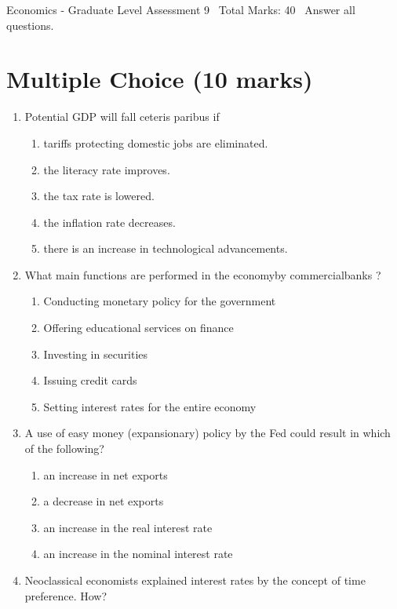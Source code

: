 \documentclass[12pt]{article}
\begin{document}
\begin{center}
Economics - Graduate Level Assessment 9 \
Total Marks: 40 \
Answer all questions.
\end{center}

\section*{Multiple Choice (10 marks)}
\begin{enumerate}[label=\arabic*.]
\item Potential GDP will fall ceteris paribus if
\begin{enumerate}[label=(\alph*)]
    \item tariffs protecting domestic jobs are eliminated.
    \item the literacy rate improves.
    \item the tax rate is lowered.
    \item the inflation rate decreases.
    \item there is an increase in technological advancements.
\end{enumerate}
\item What main functions are performed in the economyby commercialbanks ?
\begin{enumerate}[label=(\alph*)]
    \item Conducting monetary policy for the government
    \item Offering educational services on finance
    \item Investing in securities
    \item Issuing credit cards
    \item Setting interest rates for the entire economy
\end{enumerate}
\item A use of easy money (expansionary) policy by the Fed could result in which of the following?
\begin{enumerate}[label=(\alph*)]
    \item an increase in net exports
    \item a decrease in net exports
    \item an increase in the real interest rate
    \item an increase in the nominal interest rate
\end{enumerate}
\item Neoclassical economists explained interest rates by the concept of time preference. How?
\begin{enumerate}[label=(\alph*)]

\end{enumerate}
\end{enumerate}
\end{document}
